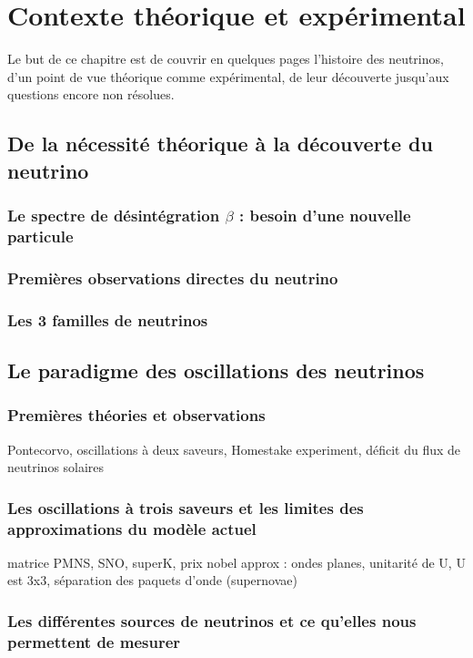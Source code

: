 \chapter{Contexte théorique et expérimental}
    
    Le but de ce chapitre est de couvrir en quelques pages l'histoire des neutrinos, d'un point de vue théorique comme expérimental, de leur découverte jusqu'aux questions encore non résolues.
    
    \section{De la nécessité théorique à la découverte du neutrino}
    
        \subsection{Le spectre de désintégration $\beta$ : besoin d'une nouvelle particule}
    
        \subsection{Premières observations directes du neutrino}
    
        \subsection{Les 3 familles de neutrinos}
    
    \section{Le paradigme des oscillations des neutrinos}
    
        \subsection{Premières théories et observations}
            Pontecorvo, oscillations à deux saveurs, Homestake experiment, déficit du flux de neutrinos solaires
        
        \subsection{Les oscillations à trois saveurs et les limites des approximations du modèle actuel}
            matrice PMNS, SNO, superK, prix nobel
            approx : ondes planes, unitarité de U, U est 3x3, séparation des paquets d'onde (supernovae)
        
        \subsection{Les différentes sources de neutrinos et ce qu'elles nous permettent de mesurer}
    
